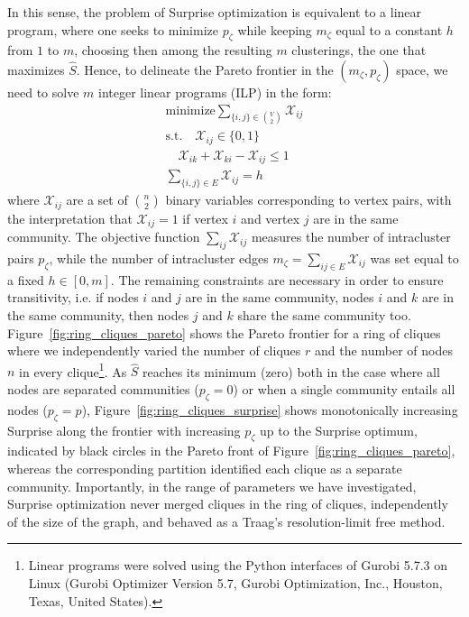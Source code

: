 In this sense, the problem of Surprise optimization is equivalent to a linear program, where one seeks to minimize $p_\zeta$ while keeping $m_\zeta$ equal to a constant $h$ from $1$ to $m$, choosing then among the resulting $m$ clusterings, the one that maximizes $\hat{S}$.
Hence, to delineate the Pareto frontier in the $(m_\zeta,p_\zeta)$ space, we need to solve $m$ integer linear programs (ILP) in the form:
\begin{align}\label{eq:surprise_ilp}
\textrm{minimize} \sum_{\{i,j\} \in \binom{V}{2}} \mathcal{X}_{ij} \nonumber \\
\textrm{s.t.} \quad \mathcal{X}_{ij} \in \{0,1 \} \nonumber \\
\quad \mathcal{X}_{ik} + \mathcal{X}_{ki} - \mathcal{X}_{ij} \leq 1 \nonumber \\
\sum_{\{i,j\} \in E} \mathcal{X}_{ij}=h \nonumber
\end{align}
where $\mathcal{X}_{ij}$ are a set of $\binom{n}{2}$ binary variables corresponding to vertex pairs, with the interpretation that $\mathcal{X}_{ij}=1$ if vertex $i$ and vertex $j$ are in the same community. The objective function $\sum_{ij}\mathcal{X}_{ij}$ measures the number of intracluster pairs $p_\zeta$, while the number of intracluster edges $m_\zeta=\sum_{ij \in E} \mathcal{X}_{ij}$ was set equal to a fixed $h \in [0,m]$. The remaining constraints are necessary in order to ensure transitivity, i.e. if nodes $i$ and $j$ are in the same community, nodes $i$ and $k$ are in the same community, then nodes $j$ and $k$ share the same community too. 
Figure~\ref{fig:ring_cliques_pareto} shows the Pareto frontier for a ring of cliques where we independently varied the number of cliques $r$ and the number of nodes $n$ in every clique\footnote{Linear programs were solved using the Python interfaces of Gurobi 5.7.3 on Linux (Gurobi Optimizer Version 5.7, Gurobi Optimization, Inc., Houston, Texas, United States).}.
As $\hat{S}$ reaches its minimum (zero) both in the case where all nodes are separated communities ($p_\zeta=0$) or when a single community entails all nodes ($p_\zeta=p$), Figure~\ref{fig:ring_cliques_surprise} shows monotonically increasing Surprise along the frontier with increasing $p_\zeta$ up to the Surprise optimum, indicated by black circles in the Pareto front of Figure~\ref{fig:ring_cliques_pareto}, whereas the corresponding partition identified each clique as a separate community.
Importantly, in the range of parameters we have investigated, Surprise optimization never merged cliques in the ring of cliques, independently of the size of the graph, and behaved as a Traag's resolution-limit free method.

